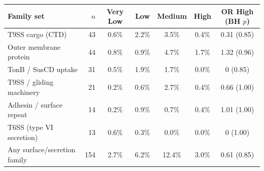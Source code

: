 \begin{tabular}{lrccccc}
\toprule
Family set & $n$ & Very Low & Low & Medium & High & OR High (BH $p$) \\
\midrule
T9SS cargo (CTD) & 43 & 0.6\% & 2.2\% & 3.5\% & 0.4\% & 0.31 (0.85) \\
Outer membrane protein & 44 & 0.8\% & 0.9\% & 4.7\% & 1.7\% & 1.32 (0.96) \\
TonB / SusCD uptake & 31 & 0.5\% & 1.9\% & 1.7\% & 0.0\% & 0 (0.85) \\
T9SS / gliding machinery & 21 & 0.2\% & 0.6\% & 2.7\% & 0.4\% & 0.66 (1.00) \\
Adhesin / surface repeat & 14 & 0.2\% & 0.9\% & 0.7\% & 0.4\% & 1.01 (1.00) \\
T6SS (type VI secretion) & 13 & 0.6\% & 0.3\% & 0.0\% & 0.0\% & 0 (1.00) \\
Any surface/secretion family & 154 & 2.7\% & 6.2\% & 12.4\% & 3.0\% & 0.61 (0.85) \\
\bottomrule
\end{tabular}
